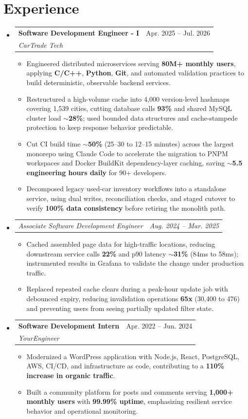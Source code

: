 \documentclass[letterpaper,11pt]{article}
\makeatletter
\newcommand{\resumeItem}[1]{
  \item\small{
    {#1 \vspace{-2pt}}
  }
}
\newcommand{\resumeSubheading}[4]{
  \vspace{-2pt}\item
    \begin{tabular*}{0.97\textwidth}[t]{l@{\extracolsep{\fill}}r}
      \textbf{#1} & #2 \\
      \textit{\small#3} & \textit{\small #4} \\
    \end{tabular*}\vspace{-7pt}
}
\newcommand{\resumeSubSubheading}[2]{
    \item
    \begin{tabular*}{0.97\textwidth}{l@{\extracolsep{\fill}}r}
      \textit{\small#1} & \textit{\small #2} \\
    \end{tabular*}\vspace{-7pt}
}
\newcommand{\resumeSubHeadingListStart}{\begin{itemize}[leftmargin=0.15in, label={}]}
\newcommand{\resumeSubHeadingListEnd}{\end{itemize}}
\newcommand{\resumeItemListStart}{\begin{itemize}}
\newcommand{\resumeItemListEnd}{\end{itemize}\vspace{-5pt}}
\makeatother
\begin{document}
\section{Experience}
\resumeSubHeadingListStart
\resumeSubheading
{Software Development Engineer - I}{Apr. 2025 -- Jul. 2026}
{CarTrade Tech}{ }
\resumeItemListStart
\resumeItem{Engineered distributed microservices serving \textbf{80M+ monthly users}, applying \textbf{C/C++}, \textbf{Python}, \textbf{Git}, and automated validation practices to build deterministic, observable backend services.}
\resumeItem{Restructured a high-volume cache into 4,000 version-level hashmaps covering 1,539 cities, cutting database calls \textbf{93\%} and shared MySQL cluster load \textbf{$\sim$28\%}; used bounded data structures and cache-stampede protection to keep response behavior predictable.}
\resumeItem{Cut CI build time \textbf{$\sim$50\%} (25--30 to 12--15 minutes) across the largest monorepo using Claude Code to accelerate the migration to PNPM workspaces and Docker BuildKit dependency-layer caching, saving \textbf{$\sim$5.5 engineering hours daily} for 90+ developers.}
\resumeItem{Decomposed legacy used-car inventory workflows into a standalone service, using dual writes, reconciliation checks, and staged cutover to verify \textbf{100\% data consistency} before retiring the monolith path.}
\resumeItemListEnd
\resumeSubSubheading
{Associate Software Development Engineer}{Aug. 2024 -- Mar. 2025}
\resumeItemListStart
\resumeItem{Cached assembled page data for high-traffic locations, reducing downstream service calls \textbf{22\%} and p90 latency \textbf{$\sim$31\%} (84ms to 58ms); instrumented results in Grafana to validate the change under production traffic.}
\resumeItem{Replaced repeated cache clears during a peak-hour update job with debounced expiry, reducing invalidation operations \textbf{65x} (30,400 to 476) and preventing users from seeing partially updated filter state.}
\resumeItemListEnd
\resumeSubheading
{Software Development Intern}{Apr. 2022 -- Jun. 2024}
{YourEngineer}{ }
\resumeItemListStart
\resumeItem{Modernized a WordPress application with Node.js, React, PostgreSQL, AWS, CI/CD, and infrastructure as code, contributing to a \textbf{110\% increase in organic traffic}.}
\resumeItem{Built a community platform for posts and comments serving \textbf{1,000+ monthly users} with \textbf{99.99\% uptime}, emphasizing resilient service behavior and operational monitoring.}
\resumeItemListEnd
\resumeSubHeadingListEnd
\end{document}
